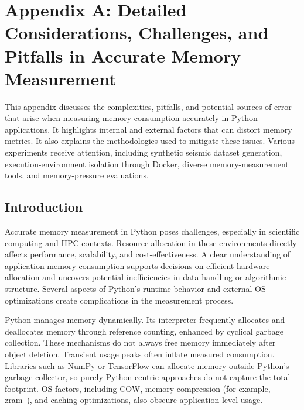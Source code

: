 \chapter*{Appendix A: Detailed Considerations, Challenges, and Pitfalls in Accurate Memory Measurement}
\label{ch:appendix-challenges-pitfalls}
\setcounter{chapter}{1}
\setcounter{section}{0}
\renewcommand{\thesection}{A.\arabic{section}}

This appendix discusses the complexities, pitfalls, and potential sources of error that arise when measuring memory consumption accurately in Python applications.
It highlights internal and external factors that can distort memory metrics.
It also explains the methodologies used to mitigate these issues.
Various experiments receive attention, including synthetic seismic dataset generation, execution-environment isolation through Docker, diverse memory-measurement tools, and memory-pressure evaluations.


\section{Introduction}
\label{sec:appendix-introduction}

Accurate memory measurement in Python poses challenges, especially in scientific computing and \ac{HPC} contexts.
Resource allocation in these environments directly affects performance, scalability, and cost-effectiveness.
A clear understanding of application memory consumption supports decisions on efficient hardware allocation and uncovers potential inefficiencies in data handling or algorithmic structure.
Several aspects of Python's runtime behavior and external \ac{OS} optimizations create complications in the measurement process.

Python manages memory dynamically.
Its interpreter frequently allocates and deallocates memory through reference counting, enhanced by cyclical garbage collection.
These mechanisms do not always free memory immediately after object deletion.
Transient usage peaks often inflate measured consumption.
Libraries such as NumPy or TensorFlow can allocate memory outside Python's garbage collector, so purely Python-centric approaches do not capture the total footprint.
\ac{OS} factors, including \ac{COW}, memory compression (for example, zram~\cite{zram}), and caching optimizations, also obscure application-level usage.

